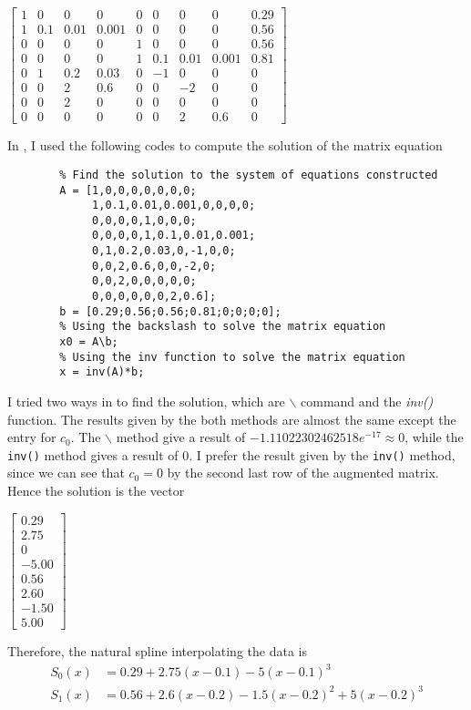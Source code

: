 \begin{answer}
    \begin{center}
    $\left[\begin{matrix}
        1 & 0 & 0 & 0 & 0 & 0 & 0 & 0 & 0.29\\
        1 & 0.1 & 0.01 & 0.001 & 0 & 0 & 0 & 0 & 0.56\\
        0 & 0 & 0 & 0 & 1 & 0 & 0 & 0 & 0.56\\
        0 & 0 & 0 & 0 & 1 & 0.1 & 0.01 & 0.001 & 0.81\\
        0 & 1 & 0.2 & 0.03 & 0 & -1 & 0 & 0 & 0 \\
        0 & 0 & 2 & 0.6 & 0 & 0 & -2 & 0 & 0\\
        0 & 0 & 2 & 0 & 0 & 0 & 0 & 0 & 0\\
        0 & 0 & 0 & 0 & 0 & 0 & 2 & 0.6 & 0
    \end{matrix}\right]$
    \end{center}
    
    In \MATLAB, I used the following codes to compute the solution of the matrix equation
    \begin{verbatim}
        % Find the solution to the system of equations constructed
        A = [1,0,0,0,0,0,0,0;
             1,0.1,0.01,0.001,0,0,0,0;
             0,0,0,0,1,0,0,0;
             0,0,0,0,1,0.1,0.01,0.001;
             0,1,0.2,0.03,0,-1,0,0;
             0,0,2,0.6,0,0,-2,0;
             0,0,2,0,0,0,0,0;
             0,0,0,0,0,0,2,0.6];
        b = [0.29;0.56;0.56;0.81;0;0;0;0];
        % Using the backslash to solve the matrix equation
        x0 = A\b;
        % Using the inv function to solve the matrix equation
        x = inv(A)*b;
    \end{verbatim}
    I tried two ways in \MATLAB to find the solution, which are $\backslash$ command and the \textit{inv()} function. The results given by the both methods are almost the same except the entry for $c_0$. The $\backslash$ method give a result of $-1.11022302462518e^{-17} \approx 0$, while the \verb+inv()+ method gives a result of $0$. I prefer the result given by the \verb+inv()+ method, since we can see that $c_0 = 0$ by the second last row of the augmented matrix.
    Hence the solution is the vector
    \begin{center}
        $\left[\begin{matrix}
        0.29\\
        2.75\\
        0\\
        -5.00\\
        0.56\\
        2.60\\
        -1.50\\
        5.00
        \end{matrix}\right]$
    \end{center}
    Therefore, the natural spline interpolating the data is
    \begin{align}
        S_0(x) &= 0.29 + 2.75(x-0.1) - 5(x-0.1)^3\\
        S_1(x) &= 0.56 + 2.6(x-0.2) - 1.5(x-0.2)^2 + 5(x-0.2)^3
    \end{align}
\end{answer}